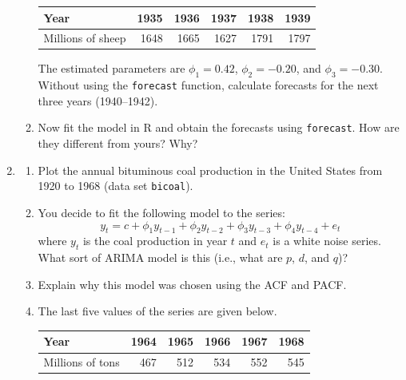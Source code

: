 \documentclass[]{book}
\begin{document}
\begin{enumerate}
\begin{enumerate}
    \begin{longtable}[]{@{}lrrrrr@{}}
    \toprule
    Year & 1935 & 1936 & 1937 & 1938 & 1939\tabularnewline
    \midrule
    \endhead
    Millions of sheep & 1648 & 1665 & 1627 & 1791 & 1797\tabularnewline
    \bottomrule
    \end{longtable}

    The estimated parameters are
    \(\phi_1 = 0.42\),
    \(\phi_2 = -0.20\), and
    \(\phi_3 = -0.30\).
    Without using the \texttt{forecast} function, calculate forecasts for the next three years (1940--1942).
  \item
    Now fit the model in R and obtain the forecasts using \texttt{forecast}. How are they different from yours? Why?
  \end{enumerate}
\item
  \begin{enumerate}
  \def\labelenumii{\alph{enumii}.}
  \item
    Plot the annual bituminous coal production in the United States from 1920 to 1968 (data set \verb|bicoal|).
  \item
    You decide to fit the following model to the series:
    \[y_t = c + \phi_1 y_{t-1} + \phi_2 y_{t-2} + \phi_3 y_{t-3} + \phi_4 y_{t-4} + e_t\]
    where \(y_t\) is the coal production in year \(t\) and \(e_t\) is a white noise series.
    What sort of ARIMA model is this (i.e., what are \(p\), \(d\), and \(q\))?
  \item
    Explain why this model was chosen using the ACF and PACF.
  \item
    The last five values of the series are given below.

    \begin{longtable}[]{@{}lrrrrr@{}}
    \toprule
    Year & 1964 & 1965 & 1966 & 1967 & 1968\tabularnewline
    \midrule
    \endhead
    Millions of tons & 467 & 512 & 534 & 552 & 545\tabularnewline
    \bottomrule
    \end{longtable}


\end{enumerate}
\end{enumerate}
\end{document}
